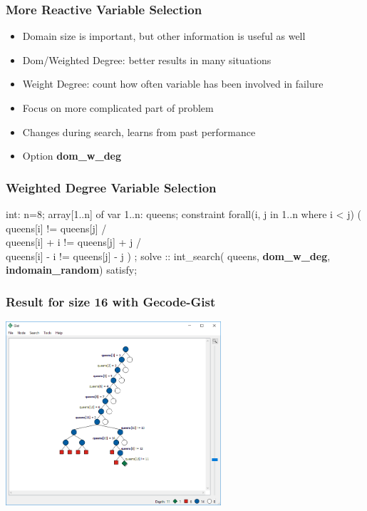 \begin{frame}
  \frametitle{More Reactive Variable Selection}
  \begin{itemize}
  \item Domain size is important, but other information is useful as well
  \item Dom/Weighted Degree: better results in many situations
  \item Weight Degree: count how often variable has been involved in failure
  \item Focus on more complicated part of problem
  \item Changes during search, learns from past performance
    \item Option \textbf{dom\_w\_deg}
  \end{itemize}
\end{frame}

\begin{frame}[fragile]
  \frametitle{Weighted Degree Variable Selection}
  \begin{semiverbatim}
int: n=8;
array[1..n] of var 1..n: queens;
constraint
    forall(i, j in 1..n where i < j) (
         queens[i] != queens[j] /\\
         queens[i] + i != queens[j] + j /\\
         queens[i] - i != queens[j] - j
    )
 ;
solve :: int\_search(
        queens,
        \textbf{dom\_w\_deg},
        \textbf{indomain\_random})
        satisfy;
  \end{semiverbatim}
\end{frame}

\begin{frame}
  \frametitle{Result for size 16 with Gecode-Gist}
  \includegraphics[width=8cm]{../nqueen/images/gistdomwdeg16}
\end{frame}

